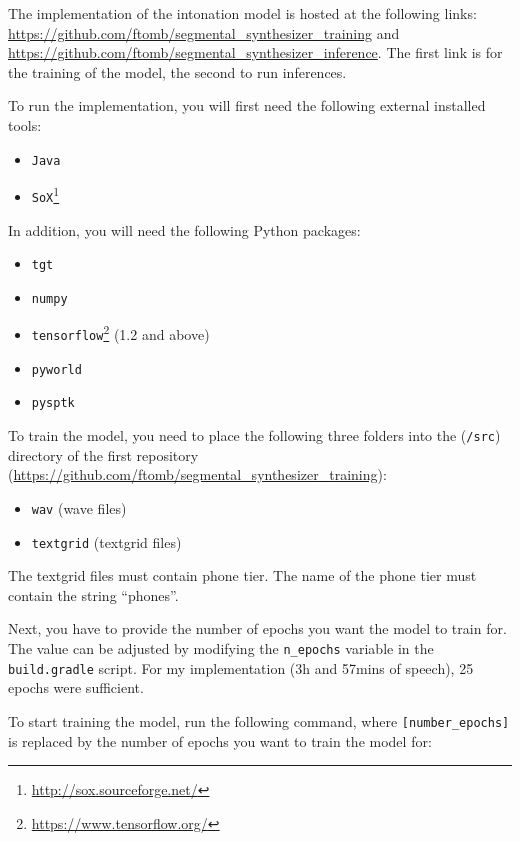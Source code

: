 The implementation of the intonation model is hosted at the following links: \url{https://github.com/ftomb/segmental_synthesizer_training} and \url{https://github.com/ftomb/segmental_synthesizer_inference}.
The first link is for the training of the model, the second to run inferences.

To run the implementation, you will first need the following external installed tools:

\begin{itemize}[noitemsep]
    \item \verb|Java|
    \item \verb|SoX|\footnote{\url{http://sox.sourceforge.net/}}
\end{itemize}

In addition, you will need the following Python packages:

\begin{itemize}[noitemsep]
    \item \verb|tgt|
    \item \verb|numpy|
    \item \verb|tensorflow|\footnote{\url{https://www.tensorflow.org/}} (1.2 and above)
    \item \verb|pyworld|
    \item \verb|pysptk|
\end{itemize}


To train the model, you need to place the following three folders into the (\verb|/src|) directory of the first repository (\url{https://github.com/ftomb/segmental_synthesizer_training}):

\begin{itemize}[noitemsep]
    \item \verb|wav| (wave files)
    \item \verb|textgrid| (textgrid files)
\end{itemize}


The textgrid files must contain phone tier.
The name of the phone tier must contain the string ``phones''.

Next, you have to provide the number of epochs you want the model to train for.
The value can be adjusted by modifying the \verb|n_epochs| variable in the \verb|build.gradle| script.
For my implementation (3h and 57mins of speech), 25 epochs were sufficient.

To start training the model, run the following command, where \verb|[number_epochs]| is replaced by the number of epochs you want to train the model for:

